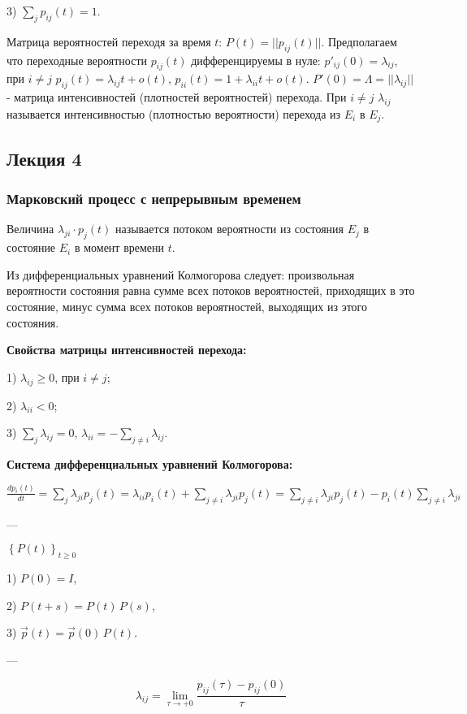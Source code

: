 3) $\sum _j p_{ij}(t)=1$.

Матрица вероятностей переходя за время $t$: $P(t)=||p_{ij}(t)||$.
Предполагаем что переходные вероятности $p_{ij}(t)$ дифференцируемы в нуле: $p'_{ij}(0)=\lambda_{ij}$, при $i\ne j$ $p_{ij}(t)=\lambda_{ij}t+o(t)$, $p_{ii}(t)=1+\lambda_{ii}t+o(t)$.
$P'(0)=\Lambda=||\lambda_{ij}||$ - матрица интенсивностей (плотностей вероятностей) перехода.
При $i\ne j$ $\lambda_{ij}$ называется интенсивностью (плотностью вероятности) перехода из $E_i$ в $E_j$.

\subsection{Лекция 4}

\subsubsection*{Марковский процесс с непрерывным временем}

Величина $\lambda_{ji} \cdot p_j(t)$ называется потоком вероятности из состояния $E_j$ в состояние $E_i$ в момент времени $t$.

Из дифференциальных уравнений Колмогорова следует: произвольная вероятности состояния равна
сумме всех потоков вероятностей, приходящих в это состояние, минус сумма всех потоков вероятностей,
выходящих из этого состояния.

\textbf{Свойства матрицы интенсивностей перехода:}

1) $\lambda_{ij}\geq 0$, при $i\ne j$;

2) $\lambda_{ii}<0$;

3) $\sum_j \lambda_{ij}=0$, $\lambda_{ii}=-\sum_{j\ne i} \lambda_{ij}$.

\textbf{Система дифференциальных уравнений Колмогорова:}

$\frac{dp_i(t)}{dt}=\sum_j \lambda_{ji} p_j(t)=\lambda_{ii} p_i(t) + \sum_{j\ne i} \lambda_{ji} p_j(t)
	=\sum_{j\ne i} \lambda_{ji} p_j(t) - p_i(t) \sum_{j\ne i} \lambda_{ji}$

---

$\left\{ {P}(t) \right\}_{t \ge 0}$

1) ${P}(0) = {I}$,

2) ${P}(t+s) = {P}(t)\,{P}(s)$,

3) $\vec{p}(t) = \vec{p}(0)\,{P}(t)$.

---

\[
	\lambda_{ij} = \lim_{\tau \to +0}
	\frac{p_{ij}(\tau) - p_{ij}(0)}{\tau}
\]


